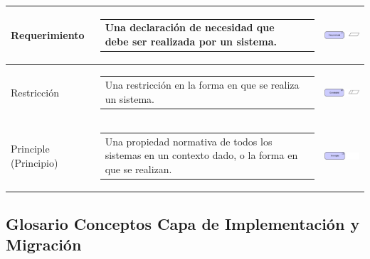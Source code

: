 \begin{longtable}[c]{|p{2.5cm}|l|c|}
	Requerimiento				& \begin{tabular}[c]{p{7cm}@{}l@{}}Una declaración de necesidad que debe ser realizada por un sistema.\end{tabular} & \includegraphics[width=35mm]{arquitectura/adm_lenguaje/imgs/motivational/Requirement}          \\ \hline
	Restricción					& \begin{tabular}[c]{p{7cm}@{}l@{}}Una restricción en la forma en que se realiza un sistema.\end{tabular} & \includegraphics[width=35mm]{arquitectura/adm_lenguaje/imgs/motivational/Constraint}          \\ \hline
	Principle (Principio)	   	& \begin{tabular}[c]{p{7cm}@{}l@{}}Una propiedad normativa de todos los sistemas en un contexto dado, o la forma en que se realizan.\end{tabular} & \includegraphics[width=35mm]{arquitectura/adm_lenguaje/imgs/motivational/Principle}          \\ \hline
\end{longtable}



\newpage

\subsection{Glosario Conceptos Capa de Implementación y Migración}

